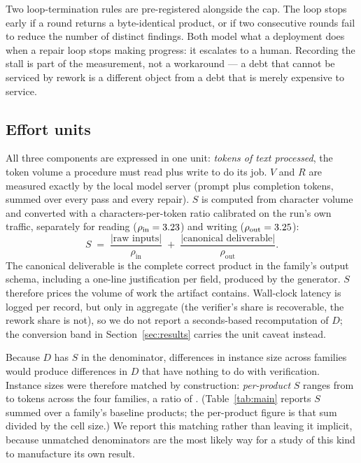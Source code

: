 \documentclass[11pt]{article}
\newcommand{\D}{\ensuremath{D}}
\newcommand{\SV}{\ensuremath{S}}
\newcommand{\VV}{\ensuremath{V}}
\newcommand{\RV}{\ensuremath{R}}
\begin{document}
Two loop-termination rules are pre-registered alongside the cap. The loop stops early if a round
returns a byte-identical product, or if two consecutive rounds fail to reduce the number of
distinct findings. Both model what a deployment does when a repair loop stops making progress:
it escalates to a human. Recording the stall is part of the measurement, not a workaround --- a
debt that cannot be serviced by rework is a different object from a debt that is merely expensive
to service.

\subsection{Effort units}

All three components are expressed in one unit: \emph{tokens of text processed}, the token volume a
procedure must read plus write to do its job. $\VV$ and $\RV$ are measured exactly by the local
model server (prompt plus completion tokens, summed over every pass and every repair). $\SV$ is
computed from character volume and converted with a characters-per-token ratio calibrated on the
run's own traffic, separately for reading ($\rho_{\text{in}}=3.23$) and writing
($\rho_{\text{out}}=3.25$):
\begin{equation}
\SV \;=\; \frac{\lvert\text{raw inputs}\rvert}{\rho_{\text{in}}}
\;+\; \frac{\lvert\text{canonical deliverable}\rvert}{\rho_{\text{out}}}.
\label{eq:S}
\end{equation}
The canonical deliverable is the complete correct product in the family's output schema, including
a one-line justification per field, produced by the generator. $\SV$ therefore prices the volume of
work the artifact contains. Wall-clock latency is logged per record, but only in aggregate (the
verifier's share is recoverable, the rework share is not), so we do not report a seconds-based
recomputation of $\D$; the conversion band in Section~\ref{sec:results} carries the unit caveat
instead.

Because $\D$ has $\SV$ in the denominator, differences in instance size across families would
produce differences in $\D$ that have nothing to do with verification. Instance sizes were
therefore matched by construction: \emph{per-product} $\SV$ ranges from \VDsmin{} to \VDsmax{}
tokens across the four families, a ratio of \VDsratio{}. (Table~\ref{tab:main} reports $\SV$ summed
over a family's baseline products; the per-product figure is that sum divided by the cell size.)
We report this matching rather than leaving it implicit, because unmatched denominators are the
most likely way for a study of this kind to manufacture its own result.
\end{document}

